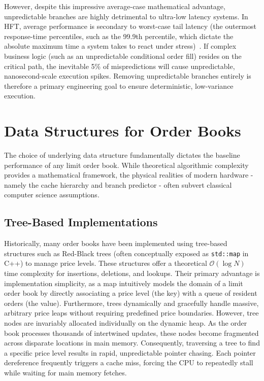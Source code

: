 
\vspace{1em}

However, despite this impressive average-case mathematical advantage, unpredictable 
branches are highly detrimental to ultra-low latency systems. 
In HFT, average performance is secondary to worst-case tail latency (the outermost 
response-time percentiles, such as the 99.9th percentile, which dictate the absolute 
maximum time a system takes to react under stress)~\citep{dean2013tail}. 
If complex business logic (such as an unpredictable conditional order fill) resides 
on the critical path, the inevitable 5\% of mispredictions will cause unpredictable, 
nanosecond-scale execution spikes. 
Removing unpredictable branches entirely is therefore a primary engineering goal 
to ensure deterministic, low-variance execution.

\section{Data Structures for Order Books}

The choice of underlying data structure fundamentally dictates the baseline 
performance of any limit order book. 
While theoretical algorithmic complexity provides a mathematical framework, the 
physical realities of modern hardware - namely the cache hierarchy and branch 
predictor - often subvert classical computer science assumptions.

\subsection{Tree-Based Implementations}
Historically, many order books have been implemented using tree-based structures 
such as Red-Black trees (often conceptually exposed as \texttt{std::map} in C++) 
to manage price levels. 
These structures offer a theoretical $\mathcal{O}(\log N)$ time complexity for 
insertions, deletions, and lookups. 
Their primary advantage is implementation simplicity, as a map intuitively models 
the domain of a limit order book by directly associating a price level (the key) 
with a queue of resident orders (the value). 
Furthermore, trees dynamically and gracefully handle massive, arbitrary price leaps 
without requiring predefined price boundaries. 
However, tree nodes are invariably allocated individually on the dynamic heap. 
As the order book processes thousands of intertwined updates, these nodes become 
fragmented across disparate locations in main memory. 
Consequently, traversing a tree to find a specific price level results in rapid, 
unpredictable pointer chasing. 
Each pointer dereference frequently triggers a cache miss, forcing the CPU to 
repeatedly stall while waiting for main memory fetches.

